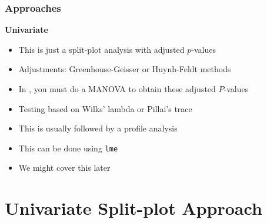 \documentclass[color=usenames,dvipsnames]{beamer}\usepackage[]{graphicx}\usepackage[]{color}
\newcommand{\inr}[1]{\colorbox{inlinecolor}{\texttt{#1}}}
\begin{document}
\begin{frame}[fragile]
   \frametitle{Approaches}
      \large
      {\bf Univariate}
        \begin{itemize}
        \normalsize
          \item<1-> This is just a split-plot analysis with adjusted $p$-values
          \item<1-> Adjustments: Greenhouse-Geisser or Huynh-Feldt methods
          \item<1-> In \R, you must do a MANOVA to obtain these adjusted $P$-values
        \end{itemize}
      \vfill
        \begin{itemize}
          \large
          \item<2-> Testing based on Wilks' lambda or Pillai's trace %
          \item<2-> This is usually followed by a profile analysis
        \end{itemize}
      \vfill
        \begin{itemize}
        \item<3-> This can be done using \inr{lme}
        \item<3-> We might cover this later%
      \end{itemize}
\end{frame}







\section{Univariate Split-plot Approach}
\end{document}
